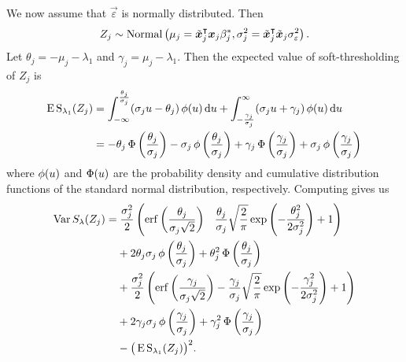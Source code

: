 We now assume that \(\vec{\varepsilon}\) is normally distributed. Then
\[
  {Z_j} \sim \operatorname{Normal}\left(\mu_j = \tilde{\boldsymbol{x}}_j^\intercal\boldsymbol{x}_j \beta_j^*, \sigma_j^2 = \tilde{\boldsymbol{x}}_j^\intercal\tilde{\boldsymbol{x}}_j \sigma_\varepsilon^2 \right).
\]
Let \(\theta_j = -\mu_j -\lambda_1 \) and \(\gamma_j = \mu_j - \lambda_1\). Then the
expected value of soft-thresholding of \({Z_j}\) is
\begin{align}
  \operatorname{E} \operatorname{S}_{\lambda_1}({Z_j}) & = \int_{-\infty}^\frac{\theta_j}{\sigma_j} (\sigma_j u - \theta_j) \operatorname{\phi}(u) \mathop{}\!\mathrm{d} u + \int_{-\frac{\gamma_j}{\sigma_j}}^\infty (\sigma_j u + \gamma_j) \operatorname{\phi}(u) \mathop{}\!\mathrm{d} u                                               \nonumber                              \\
                            & = -\theta_j \operatorname{\Phi}\left(\frac{\theta_j}{\sigma_j}\right) - \sigma_j \operatorname{\phi}\left(\frac{\theta_j}{\sigma_j}\right) + \gamma_j \operatorname{\Phi}\left(\frac{\gamma_j}{\sigma_j}\right) + \sigma_j \operatorname{\phi}\left(\frac{\gamma_j}{\sigma_j}\right) \label{eq:mean-centered-eval}
\end{align}
where \(\operatorname{\phi}(u)\) and \(\operatorname{\Phi}(u)\) are the probability density and cumulative distribution
functions of the standard normal distribution, respectively. Computing  gives us
\begin{align}
  \label{eq:mean-centered-variance}
  \var{S_\lambda(Z_j)} & = \frac{\sigma_j^2}{2} \left( \erf\left(\frac{\theta_j}{\sigma_j\sqrt{2}}\right) \phantom{-{}} \frac{\theta_j}{\sigma_j}\sqrt{\frac{2}{\pi}} \exp\left(-\frac{\theta_j^2}{2\sigma_j^2}\right) + 1 \right)  \nonumber  \\
                       & \phantom{={}} + 2 \theta_j \sigma_j \pdf \left(\frac{\theta_j}{\sigma_j}\right) + \theta_j^2 \cdf\left(\frac{\theta_j}{\sigma_j}\right) \nonumber                                                                     \\
                       & \phantom{={}} + \frac{\sigma_j^2}{2} \left( \erf\left(\frac{\gamma_j}{\sigma_j\sqrt{2}}\right) - \frac{\gamma_j}{\sigma_j}\sqrt{\frac{2}{\pi}} \exp\left(-\frac{\gamma_j^2}{2\sigma_j^2}\right) + 1 \right) \nonumber \\
                       & \phantom{={}} + 2 \gamma_j \sigma_j \pdf \left(\frac{\gamma_j}{\sigma_j}\right) + \gamma_j^2 \cdf\left(\frac{\gamma_j}{\sigma_j}\right) \nonumber                                                                     \\
                       & \phantom{={}} - \big(\E \st_{\lambda_1}({Z_j})\big)^2.
\end{align}

